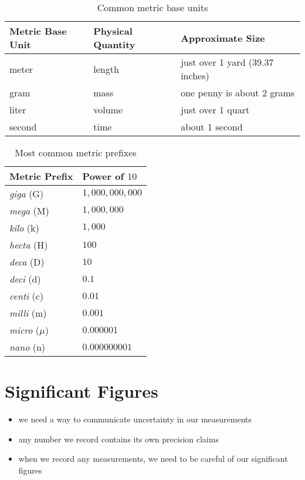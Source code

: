 \documentclass[11pt, oneside]{article}   	%
\begin{document}
\begin{table}[p]
\centering
\begin{tabular}[b]{l | l| l}
\hline
Metric Base Unit & Physical Quantity & Approximate Size \\
\hline
meter                  & length                   & just over 1 yard (39.37 inches) \\
gram                   & mass                    & one penny is about 2 grams \\
liter                      & volume                 & just over 1 quart \\
second                & time                      & about 1 second \\
\end{tabular}
\caption{Common metric base units}
\label{table:mbaseunits}
\end{table}


\begin{table}[p]
\centering
\begin{tabular}[b]{l|l}
\hline
Metric Prefix & Power of $10$ \\
\hline
\emph{giga} (G)           & $ 1,000,000,000 $   \\
\emph{mega} (M)         & $ 1,000,000 $   \\
\emph{kilo} (k)              & $ 1,000 $   \\
\emph{hecta} (H)          & $ 100 $   \\
\emph{deca} (D)           & $ 10 $   \\
\emph{deci} (d)             & $ 0.1 $   \\
\emph{centi} (c)            & $ 0.01 $   \\
\emph{milli}  (m)           & $ 0.001 $  \\
\emph{micro} ($\mu$)  & $ 0.000001 $  \\
\emph{nano}  (n)           & $ 0.000000001 $  \\
\end{tabular}
\caption{Most common metric prefixes}
\label{table:mprefixes}
\end{table}


\section{Significant Figures}
\begin{itemize}
\item we need a way to communicate uncertainty in our measurements
\item any number we record contains its own precision claims
\item when we record any measurements, we need to be careful of our significant figures
\end{itemize}
\end{document}

